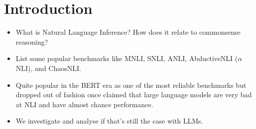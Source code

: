\section{Introduction}

\begin{itemize}
  \item What is Natural Language Inference? How does it relate to commonsense reasoning?
  \item List some popular benchmarks like MNLI, SNLI, ANLI, AbductiveNLI ($\alpha$NLI), and ChaosNLI.
  \item Quite popular in the BERT era as one of the most reliable benchmarks but dropped out of fashion once \citet{brown2020languagemodelsfewshotlearners} claimed that large language models are very bad at NLI and have almost chance performance.
  \item We investigate and analyse if that's still the case with LLMs.
\end{itemize}

